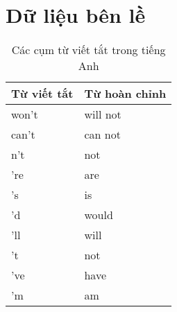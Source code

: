 \section*{Dữ liệu bên lề}
\begin{table}[htb]
    \centering
    \caption{Các cụm từ viết tắt trong tiếng Anh}
    \label{table:english-contractions}
    \begin{tabular}{ll}
        \toprule
        \textbf{Từ viết tắt} & \textbf{Từ hoàn chỉnh} \\\midrule
        won't                & will not               \\
        can't                & can not                \\
        n't                  & not                    \\
        're                  & are                    \\
        's                   & is                     \\
        'd                   & would                  \\
        'll                  & will                   \\
        't                   & not                    \\
        've                  & have                   \\
        'm                   & am                     \\
        \bottomrule
    \end{tabular}
\end{table}

